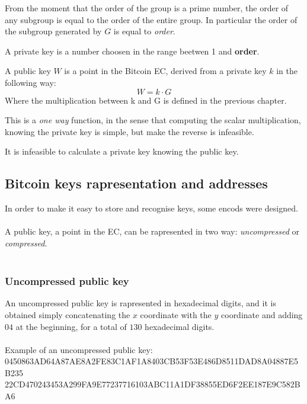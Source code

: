 From the moment that the order of the group is a prime number, the order of any subgroup is equal to the order of the entire group. In particular the order of the subgroup generated by $G$ is equal to \textit{order}.

\begin{definition}
	A private key is a number choosen in the range beetwen 1 and \textbf{order}.
\end{definition}

\begin{definition}
	A public key $W$ is a point in the Bitcoin EC, derived from a private key $k$ in the following way: \\
	\begin{equation}
		W=k\cdot G
	\end{equation}
	Where the multiplication between k and G is defined in the previous chapter.
\end{definition}

This is a \textit{one way} function, in the sense that computing the scalar multiplication, knowing the private key is simple, but make the reverse is infeasible.
\begin{remark}
	It is infeasible to calculate a private key knowing the public key.
\end{remark}


\subsection{Bitcoin keys rapresentation and addresses}
In order to make it easy to store and recognise keys, some encods were designed.
\\ \\
A public key, a point in the EC, can be rapresented in two way: \textit{uncompressed} or \textit{compressed}.\\ \\
\subsubsection{Uncompressed public key}
An uncompressed public key is rapresented in hexadecimal digits, and it is obtained simply concatenating the $x$ coordinate with the $y$ coordinate and adding $04$ at the beginning, for a total of $130$ hexadecimal digits. \\ \\
Example of an uncompressed public key: \\
0450863AD64A87AE8A2FE83C1AF1A8403CB53F53E486D8511DAD8A04887E5B235 22CD470243453A299FA9E77237716103ABC11A1DF38855ED6F2EE187E9C582BA6


